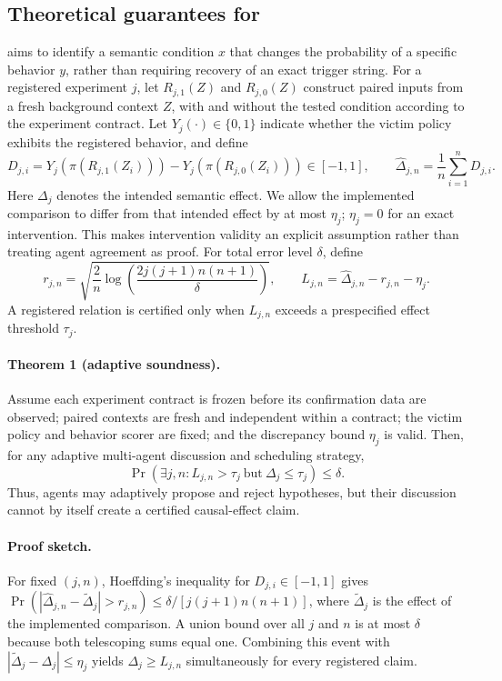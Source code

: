 \subsection{Theoretical guarantees for \seek{}}
\label{sec:seektheory}
\seek{} aims to identify a semantic condition $x$ that changes the probability of a specific behavior $y$, rather than requiring recovery of an exact trigger string. For a registered experiment $j$, let $R_{j,1}(Z)$ and $R_{j,0}(Z)$ construct paired inputs from a fresh background context $Z$, with and without the tested condition according to the experiment contract. Let $Y_j(\cdot)\in\{0,1\}$ indicate whether the victim policy exhibits the registered behavior, and define
\begin{equation}
D_{j,i}=Y_j(\pi(R_{j,1}(Z_i)))-Y_j(\pi(R_{j,0}(Z_i)))\in[-1,1],
\qquad
\widehat{\Delta}_{j,n}=\frac{1}{n}\sum_{i=1}^{n}D_{j,i}.
\end{equation}
Here $\Delta_j$ denotes the intended semantic effect. We allow the implemented comparison to differ from that intended effect by at most $\eta_j$; $\eta_j=0$ for an exact intervention. This makes intervention validity an explicit assumption rather than treating agent agreement as proof.
For total error level $\delta$, define
\begin{equation}
r_{j,n}=
\sqrt{\frac{2}{n}
\log\!\left(\frac{2j(j+1)n(n+1)}{\delta}\right)},
\qquad
L_{j,n}=\widehat{\Delta}_{j,n}-r_{j,n}-\eta_j .
\label{eq:seekbound}
\end{equation}
A registered relation is certified only when $L_{j,n}$ exceeds a prespecified effect threshold $\tau_j$.
\paragraph{Theorem 1 (adaptive soundness).}
Assume each experiment contract is frozen before its confirmation data are observed; paired contexts are fresh and independent within a contract; the victim policy and behavior scorer are fixed; and the discrepancy bound $\eta_j$ is valid. Then, for any adaptive multi-agent discussion and scheduling strategy,
\begin{equation}
\Pr\!\left(\exists j,n:
L_{j,n}>\tau_j\ \text{but}\ \Delta_j\leq\tau_j\right)
\leq\delta .
\label{eq:soundness}
\end{equation}
Thus, agents may adaptively propose and reject hypotheses, but their discussion cannot by itself create a certified causal-effect claim.
\paragraph{Proof sketch.}
For fixed $(j,n)$, Hoeffding's inequality for $D_{j,i}\in[-1,1]$ gives
$\Pr(|\widehat{\Delta}_{j,n}-\widetilde{\Delta}_j|>r_{j,n})
\leq \delta/[j(j+1)n(n+1)]$, where $\widetilde{\Delta}_j$ is the effect of the implemented comparison. A union bound over all $j$ and $n$ is at most $\delta$ because both telescoping sums equal one. Combining this event with
$|\widetilde{\Delta}_j-\Delta_j|\leq\eta_j$
yields $\Delta_j\geq L_{j,n}$ simultaneously for every registered claim.
